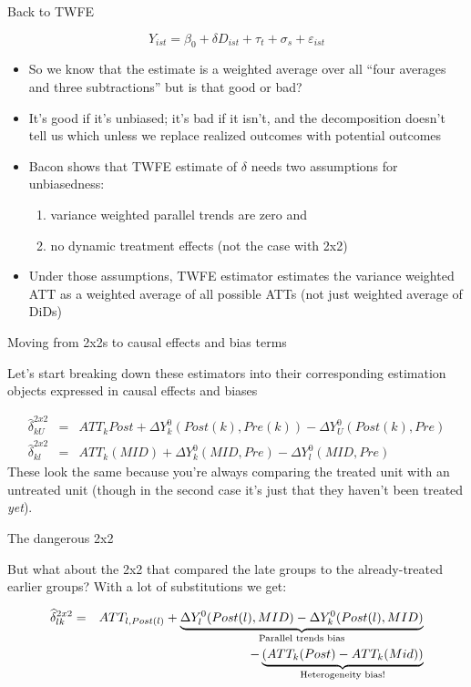 \documentclass{beamer}
\begin{document}
\begin{frame}{Back to TWFE}


$$Y_{ist} = \beta_0 + \delta D_{ist} + \tau_t + \sigma_s + \varepsilon_{ist}$$


\begin{itemize}

\item So we know that the estimate is a weighted average over all ``four averages and three subtractions'' but is that good or bad?
\item It's good if it's unbiased; it's bad if it isn't, and the decomposition doesn't tell us which unless we replace realized outcomes with potential outcomes
\item Bacon shows that TWFE estimate of $\delta$ needs two assumptions for unbiasedness:
	\begin{enumerate}
	\item variance weighted parallel trends are zero and 
	\item no dynamic treatment effects (not the case with 2x2)
	\end{enumerate}
\item Under those assumptions, TWFE estimator estimates the variance weighted ATT as a weighted average of all possible ATTs (not just weighted average of DiDs)

\end{itemize}

\end{frame}


\begin{frame}{Moving from 2x2s to causal effects and bias terms}

Let's start breaking down these estimators into their corresponding estimation objects expressed in causal effects and biases


\begin{eqnarray*}
\widehat{\delta}^{2x2}_{kU} &=& ATT_k{Post} + \Delta Y^0_k(Post(k),Pre(k)) - \Delta Y^0_U(Post(k),Pre) \\
\widehat{\delta}^{2x2}_{kl} &=& ATT_k(MID) + \Delta Y^0_k(MID,Pre) - \Delta Y^0_l(MID, Pre)
\end{eqnarray*}These look the same because you're always comparing the treated unit with an untreated unit (though in the second case it's just that they haven't been treated \emph{yet}). 

\end{frame}

\begin{frame}{The dangerous 2x2}

But what about the 2x2 that compared the late groups to the already-treated earlier groups? With a lot of substitutions we get:

\begin{eqnarray*}
\widehat{\delta}^{2x2}_{lk} &=& ATT_{l,Post(l)} + \underbrace{\Delta Y^0_l(Post(l),MID) - \Delta Y^0_k ( Post(l), MID)}_{\mathclap{\text{Parallel trends bias}}} \\
&& - \underbrace{(ATT_k(Post) - ATT_k(Mid))}_{\mathclap{\text{Heterogeneity bias!}}}
\end{eqnarray*}


\end{frame}
\end{document}
